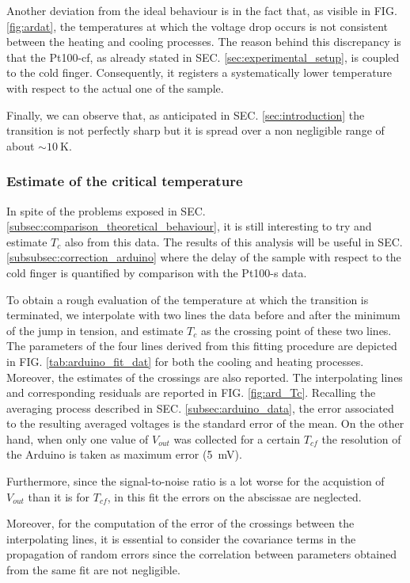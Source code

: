 \documentclass[rmp,10pt,onecolumn,fleqn,notitlepage]{revtex4-1}
\begin{document}
Another deviation from the ideal behaviour is in the fact that, as visible in FIG. \ref{fig:ardat}, the temperatures at which the voltage drop occurs is not consistent between the heating and cooling processes. The reason behind this discrepancy is that the Pt100-cf, as already stated in SEC. \ref{sec:experimental_setup}, is coupled to the cold finger. Consequently, it registers a systematically lower temperature with respect to the actual one of the sample. 

Finally, we can observe that, as anticipated in SEC. \ref{sec:introduction} the transition is not perfectly sharp but it is spread over a non negligible range of about $\sim \SI{10}{\kelvin}$.


\subsubsection{Estimate of the critical temperature}
\label{subsubsec:arduino_estimate_critical_temperature}

In spite of the problems exposed in SEC. \ref{subsec:comparison_theoretical_behaviour}, it is still interesting to try and estimate $T_c$ also from this data. The results of this analysis will be useful in SEC. \ref{subsubsec:correction_arduino} where the delay of the sample with respect to the cold finger is quantified by comparison with the Pt100-s data.

To obtain a rough evaluation of the temperature at which the transition is terminated, we interpolate with two lines the data before and after the minimum of the jump in tension, and estimate $T_c$ as the crossing point of these two lines. The parameters of the four lines derived from this fitting procedure are depicted in FIG. \ref{tab:arduino_fit_dat} for both the cooling and heating processes. Moreover, the estimates of the crossings are also reported. The interpolating lines and corresponding residuals are reported in FIG. \ref{fig:ard_Tc}. 
Recalling the averaging process described in SEC. \ref{subsec:arduino_data}, the error associated to the resulting averaged voltages is the standard error of the mean. On the other hand, when only one value of $V_{out}$ was collected for a certain $T_{cf}$ the resolution of the Arduino is taken as maximum error  (\SI{5}{\milli \volt}). 

Furthermore, since the signal-to-noise ratio is a lot worse for the acquistion of $V_{out}$ than it is for $T_{cf}$, in this fit the errors on the abscissae are neglected. 

Moreover, for the computation of the error of the crossings between the interpolating lines, it is essential to consider the covariance terms in the propagation of random errors since the correlation between parameters obtained from the same fit are not negligible.
\end{document}
